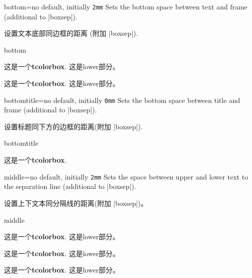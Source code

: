 \begin{docTcbKey}{bottom}{=}{no default, initially \texttt{2mm}}
  Sets the bottom space between text and frame (additional to |boxsep|).

设置文本底部同边框的距离 (附加 |boxsep|).
\begin{exdispExample}{bottom}

\begin{tcolorbox}[bottom=0mm]
这是一个\textbf{tcolorbox}.
\tcblower
这是lower部分。
\end{tcolorbox}
\begin{tcolorbox}
  这是一个\textbf{tcolorbox}.
  \tcblower
  这是lower部分。
  \end{tcolorbox}
\end{exdispExample}
\end{docTcbKey}

\begin{docTcbKey}{bottomtitle}{=}{no default, initially \texttt{0mm}}
  Sets the bottom space between title and frame (additional to |boxsep|).

设置标题同下方的边框的距离(附加 |boxsep|).
\begin{exdispExample}{bottomtitle}

\begin{tcolorbox}[bottomtitle=3mm,title=My title]
这是一个\textbf{tcolorbox}.
\end{tcolorbox}
\end{exdispExample}
\end{docTcbKey}


\begin{docTcbKey}{middle}{=}{no default, initially \texttt{2mm}}
Sets the space between upper and lower text to the separation line
(additional to |boxsep|).


设置上下文本同分隔线的距离(附加 |boxsep|)。
\begin{exdispExample}{middle}

\begin{tcolorbox}[middle=0mm,boxsep=0mm]
这是一个\textbf{tcolorbox}.
\tcblower
这是lower部分。
\end{tcolorbox}
\begin{tcolorbox}[boxsep=0mm]
这是一个\textbf{tcolorbox}.
\tcblower
这是lower部分。
\end{tcolorbox}
\begin{tcolorbox}
这是一个\textbf{tcolorbox}.
\tcblower
这是lower部分。
\end{tcolorbox}
\end{exdispExample}
\end{docTcbKey}


